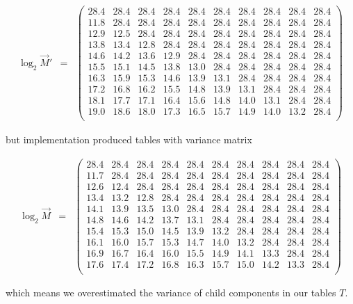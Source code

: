 \begin{footnotesize}
\begin{eqnarray*}
\log_2 \vec{M}' &=& \left(\begin{array}{cccccccccc} 
28.4 & 28.4 & 28.4 & 28.4 & 28.4 & 28.4 & 28.4 & 28.4 & 28.4 & 28.4\\
11.8 & 28.4 & 28.4 & 28.4 & 28.4 & 28.4 & 28.4 & 28.4 & 28.4 & 28.4\\
12.9 & 12.5 & 28.4 & 28.4 & 28.4 & 28.4 & 28.4 & 28.4 & 28.4 & 28.4\\
13.8 & 13.4 & 12.8 & 28.4 & 28.4 & 28.4 & 28.4 & 28.4 & 28.4 & 28.4\\
14.6 & 14.2 & 13.6 & 12.9 & 28.4 & 28.4 & 28.4 & 28.4 & 28.4 & 28.4\\
15.5 & 15.1 & 14.5 & 13.8 & 13.0 & 28.4 & 28.4 & 28.4 & 28.4 & 28.4\\
16.3 & 15.9 & 15.3 & 14.6 & 13.9 & 13.1 & 28.4 & 28.4 & 28.4 & 28.4\\
17.2 & 16.8 & 16.2 & 15.5 & 14.8 & 13.9 & 13.1 & 28.4 & 28.4 & 28.4\\
18.1 & 17.7 & 17.1 & 16.4 & 15.6 & 14.8 & 14.0 & 13.1 & 28.4 & 28.4\\
19.0 & 18.6 & 18.0 & 17.3 & 16.5 & 15.7 & 14.9 & 14.0 & 13.2 & 28.4\\
\end{array}\right)
\end{eqnarray*}
\end{footnotesize}
but implementation produced tables with variance matrix
\begin{footnotesize}
\begin{eqnarray*}
\log_2 \vec{M} &=& \left(\begin{array}{cccccccccc} 
28.4 & 28.4 & 28.4 & 28.4 & 28.4 & 28.4 & 28.4 & 28.4 & 28.4 & 28.4\\
11.7 & 28.4 & 28.4 & 28.4 & 28.4 & 28.4 & 28.4 & 28.4 & 28.4 & 28.4\\
12.6 & 12.4 & 28.4 & 28.4 & 28.4 & 28.4 & 28.4 & 28.4 & 28.4 & 28.4\\
13.4 & 13.2 & 12.8 & 28.4 & 28.4 & 28.4 & 28.4 & 28.4 & 28.4 & 28.4\\
14.1 & 13.9 & 13.5 & 13.0 & 28.4 & 28.4 & 28.4 & 28.4 & 28.4 & 28.4\\
14.8 & 14.6 & 14.2 & 13.7 & 13.1 & 28.4 & 28.4 & 28.4 & 28.4 & 28.4\\
15.4 & 15.3 & 15.0 & 14.5 & 13.9 & 13.2 & 28.4 & 28.4 & 28.4 & 28.4\\
16.1 & 16.0 & 15.7 & 15.3 & 14.7 & 14.0 & 13.2 & 28.4 & 28.4 & 28.4\\
16.9 & 16.7 & 16.4 & 16.0 & 15.5 & 14.9 & 14.1 & 13.3 & 28.4 & 28.4\\
17.6 & 17.4 & 17.2 & 16.8 & 16.3 & 15.7 & 15.0 & 14.2 & 13.3 & 28.4\\
\end{array}\right)
\end{eqnarray*}
\end{footnotesize}
which means we overestimated the variance of child components in our tables $T$.

